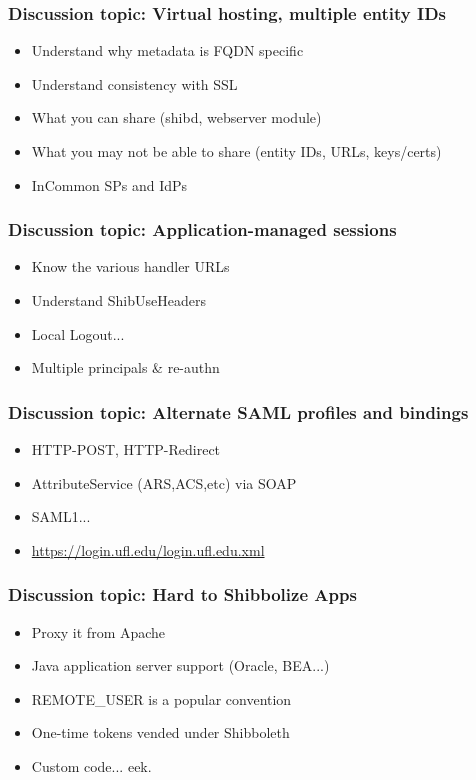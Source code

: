 \documentclass[hyperref={colorlinks=true},professionalfonts]{beamer}
\begin{document}
\begin{frame}
\frametitle{Discussion topic: Virtual hosting, multiple entity IDs}
\begin{itemize}
\item Understand why metadata is FQDN specific
\item Understand consistency with SSL
\item What you can share (shibd, webserver module)
\item What you may not be able to share (entity IDs, URLs, keys/certs)
\item InCommon SPs and IdPs
\end{itemize}
\end{frame}

\begin{frame}
\frametitle{Discussion topic: Application-managed sessions}
\begin{itemize}
\item Know the various handler URLs 
\item Understand ShibUseHeaders 
\item Local Logout... 
\item Multiple principals \& re-authn
\end{itemize}
\end{frame}

\begin{frame}
\frametitle{Discussion topic: Alternate SAML profiles and bindings}
\begin{itemize}
\item HTTP-POST, HTTP-Redirect
\item AttributeService (ARS,ACS,etc) via SOAP
\item SAML1... 
\item \url{https://login.ufl.edu/login.ufl.edu.xml}
\end{itemize}
\end{frame}

\begin{frame}
\frametitle{Discussion topic: Hard to Shibbolize Apps }
\begin{itemize}
\item Proxy it from Apache 
\item Java application server support (Oracle, BEA...)
\item REMOTE\_USER is a popular convention
\item One-time tokens vended under Shibboleth 
\item Custom code... eek.
\end{itemize}
\end{frame}
\end{document}
